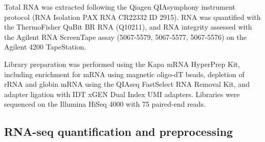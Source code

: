 %

Total RNA was extracted following the Qiagen QIAsymphony instrument protocol (RNA Isolation PAX RNA CR22332 ID 2915).
RNA was quantified with the ThermoFisher QuBit BR RNA (Q10211), 
and RNA integrity assessed with the Agilent RNA ScreenTape assay (5067-5579, 5067-5577, 5067-5576) on the Agilent 4200 TapeStation.

Library preparation was performed using the Kapa mRNA HyperPrep Kit, including enrichment for \gls{mRNA} using magnetic oligo-dT beads, depletion of \gls{rRNA} and globin \gls{mRNA} using the QIAseq FastSelect RNA Removal Kit, and adapter ligation with IDT xGEN Dual Index UMI adapters.
Libraries were sequenced on the Illumina HiSeq 4000 with \SI{75}{\bp} paired-end reads.

\subsection{RNA-seq quantification and preprocessing}

